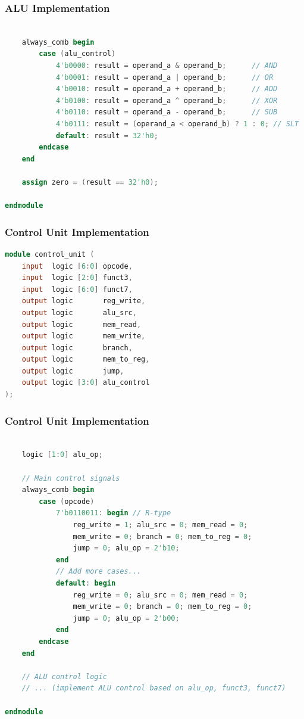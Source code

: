 \documentclass[aspectratio=169,xcolor=dvipsnames]{beamer}
\begin{document}
\begin{frame}[fragile]
\frametitle{ALU Implementation}
\begin{lstlisting}[language=Verilog]

    always_comb begin
        case (alu_control)
            4'b0000: result = operand_a & operand_b;      // AND
            4'b0001: result = operand_a | operand_b;      // OR
            4'b0010: result = operand_a + operand_b;      // ADD
            4'b0100: result = operand_a ^ operand_b;      // XOR
            4'b0110: result = operand_a - operand_b;      // SUB
            4'b0111: result = (operand_a < operand_b) ? 1 : 0; // SLT
            default: result = 32'h0;
        endcase
    end

    assign zero = (result == 32'h0);

endmodule
\end{lstlisting}
\end{frame}

\begin{frame}[fragile]
\frametitle{Control Unit Implementation}
\begin{lstlisting}[language=Verilog]
module control_unit (
    input  logic [6:0] opcode,
    input  logic [2:0] funct3,
    input  logic [6:0] funct7,
    output logic       reg_write,
    output logic       alu_src,
    output logic       mem_read,
    output logic       mem_write,
    output logic       branch,
    output logic       mem_to_reg,
    output logic       jump,
    output logic [3:0] alu_control
);

\end{lstlisting}
\end{frame}


\begin{frame}[fragile]
\frametitle{Control Unit Implementation}
\begin{lstlisting}[language=Verilog]

    logic [1:0] alu_op;

    // Main control signals
    always_comb begin
        case (opcode)
            7'b0110011: begin // R-type
                reg_write = 1; alu_src = 0; mem_read = 0;
                mem_write = 0; branch = 0; mem_to_reg = 0;
                jump = 0; alu_op = 2'b10;
            end
            // Add more cases...
            default: begin
                reg_write = 0; alu_src = 0; mem_read = 0;
                mem_write = 0; branch = 0; mem_to_reg = 0;
                jump = 0; alu_op = 2'b00;
            end
        endcase
    end

    // ALU control logic
    // ... (implement ALU control based on alu_op, funct3, funct7)

endmodule
\end{lstlisting}
\end{frame}
\end{document}
